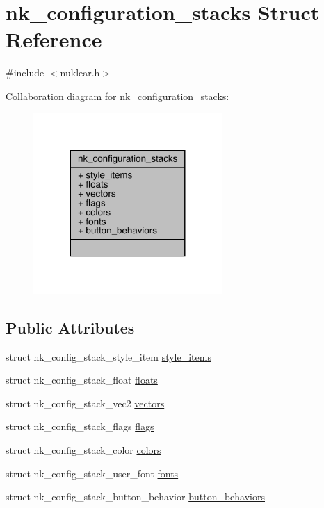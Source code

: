 \hypertarget{structnk__configuration__stacks}{}\section{nk\+\_\+configuration\+\_\+stacks Struct Reference}
\label{structnk__configuration__stacks}


{\ttfamily \#include $<$nuklear.\+h$>$}



Collaboration diagram for nk\+\_\+configuration\+\_\+stacks\+:
\nopagebreak
\begin{figure}[H]
\begin{center}
\leavevmode
\includegraphics[width=203pt]{structnk__configuration__stacks__coll__graph}
\end{center}
\end{figure}
\subsection*{Public Attributes}
\begin{DoxyCompactItemize}
\item 
struct nk\+\_\+config\+\_\+stack\+\_\+style\+\_\+item \mbox{\hyperlink{structnk__configuration__stacks_a55967201de962032e2f803bca733bb31}{style\+\_\+items}}
\item 
struct nk\+\_\+config\+\_\+stack\+\_\+float \mbox{\hyperlink{structnk__configuration__stacks_aaa0169624803bd2dbb6c871930901ba5}{floats}}
\item 
struct nk\+\_\+config\+\_\+stack\+\_\+vec2 \mbox{\hyperlink{structnk__configuration__stacks_a24a2fbd356785b0ac5dc302605dbe736}{vectors}}
\item 
struct nk\+\_\+config\+\_\+stack\+\_\+flags \mbox{\hyperlink{structnk__configuration__stacks_a54e6f345ddb5f80b1b5c4985f3bad922}{flags}}
\item 
struct nk\+\_\+config\+\_\+stack\+\_\+color \mbox{\hyperlink{structnk__configuration__stacks_a72201e81abce704239551304a41d43bb}{colors}}
\item 
struct nk\+\_\+config\+\_\+stack\+\_\+user\+\_\+font \mbox{\hyperlink{structnk__configuration__stacks_addf7cdf072a4c6cc7fc5a545b578b892}{fonts}}
\item 
struct nk\+\_\+config\+\_\+stack\+\_\+button\+\_\+behavior \mbox{\hyperlink{structnk__configuration__stacks_acdd04ace1959669efbcf441cd6c154e0}{button\+\_\+behaviors}}
\end{DoxyCompactItemize}


